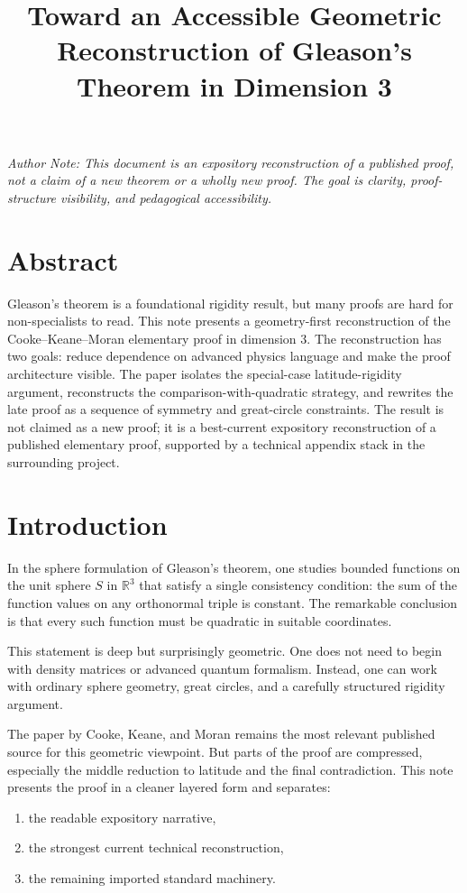 \documentclass[11pt]{article}
\title{Toward an Accessible Geometric Reconstruction of Gleason's Theorem in Dimension 3}
\author{}
\date{}
\begin{document}
\maketitle

\begin{center}
\textit{Author Note: This document is an expository reconstruction of a published proof, not a claim of a new theorem or a wholly new proof. The goal is clarity, proof-structure visibility, and pedagogical accessibility.}
\end{center}

\section*{Abstract}
Gleason's theorem is a foundational rigidity result, but many proofs are hard for non-specialists to read. This note presents a geometry-first reconstruction of the Cooke--Keane--Moran elementary proof in dimension $3$. The reconstruction has two goals: reduce dependence on advanced physics language and make the proof architecture visible. The paper isolates the special-case latitude-rigidity argument, reconstructs the comparison-with-quadratic strategy, and rewrites the late proof as a sequence of symmetry and great-circle constraints. The result is not claimed as a new proof; it is a best-current expository reconstruction of a published elementary proof, supported by a technical appendix stack in the surrounding project.

\section{Introduction}
In the sphere formulation of Gleason's theorem, one studies bounded functions on the unit sphere $S$ in $\mathbb{R}^3$ that satisfy a single consistency condition: the sum of the function values on any orthonormal triple is constant. The remarkable conclusion is that every such function must be quadratic in suitable coordinates.

This statement is deep but surprisingly geometric. One does not need to begin with density matrices or advanced quantum formalism. Instead, one can work with ordinary sphere geometry, great circles, and a carefully structured rigidity argument.

The paper by Cooke, Keane, and Moran remains the most relevant published source for this geometric viewpoint. But parts of the proof are compressed, especially the middle reduction to latitude and the final contradiction. This note presents the proof in a cleaner layered form and separates:
\begin{enumerate}[label=\arabic*.]
\item the readable expository narrative,
\item the strongest current technical reconstruction,
\item the remaining imported standard machinery.
\end{enumerate}
\end{document}
